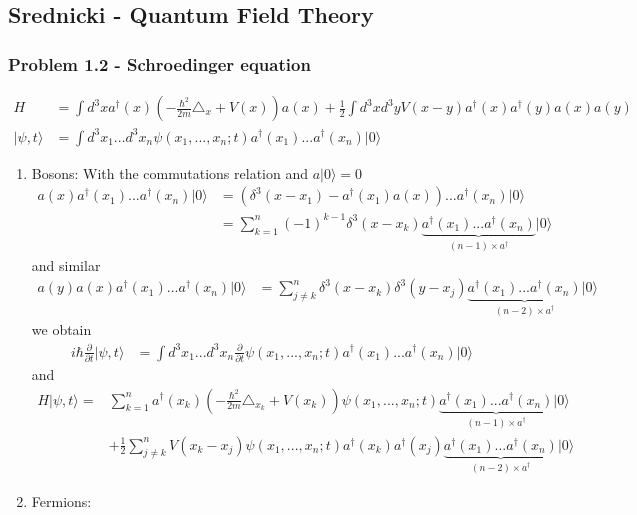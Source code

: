 \documentclass[10pt,a4paper]{book}
\theoremstyle{definition}
\begin{document}
\subsection{{\sc Srednicki} - Quantum Field Theory}
\subsubsection{Problem 1.2 - Schroedinger equation}
\begin{align}
    H&=\int d^3x a^\dagger(x)\left(-\frac{\hbar^2}{2m}\triangle_x+V(x)\right)a(x)+\frac{1}{2}\int d^3xd^3yV(x-y)a^\dagger(x)a^\dagger(y)a(x)a(y)\\
    |\psi,t\rangle&=\int d^3x_1...d^3x_n\psi(x_1,...,x_n;t)a^\dagger(x_1)...a^\dagger(x_n)|0\rangle
\end{align}
\begin{enumerate}
    \item Bosons:
    With the commutations relation and $a|0\rangle=0$
    \begin{align}
        a(x)a^\dagger(x_1)...a^\dagger(x_n)|0\rangle
        &=\left(\delta^3(x-x_1)-a^\dagger(x_1)a(x)\right)...a^\dagger(x_n)|0\rangle\\
        &=\sum_{k=1}^n(-1)^{k-1} \delta^3(x-x_k)\underbrace{a^\dagger(x_1)...a^\dagger(x_n)}_{(n-1) \times a^\dagger}|0\rangle
    \end{align}
    and similar
    \begin{align}
        a(y)a(x)a^\dagger(x_1)...a^\dagger(x_n)|0\rangle
        &=\sum_{j\neq k}^n \delta^3(x-x_k)\delta^3(y-x_j)\underbrace{a^\dagger(x_1)...a^\dagger(x_n)}_{(n-2) \times a^\dagger}|0\rangle
    \end{align}
    we obtain
	\begin{align}
		i\hbar\frac{\partial}{\partial t}|\psi,t\rangle
		&=\int d^3x_1...d^3x_n\frac{\partial}{\partial t}\psi(x_1,...,x_n;t)a^\dagger(x_1)...a^\dagger(x_n)|0\rangle 
	\end{align}
    and
    \begin{align}
        H|\psi,t\rangle=&\sum_{k=1}^na^\dagger(x_k)\left(-\frac{\hbar^2}{2m}\triangle_{x_k}+V(x_k)\right)\psi(x_1,...,x_n;t)\underbrace{a^\dagger(x_1)...a^\dagger(x_n)}_{(n-1) \times a^\dagger}|0\rangle\\
        &+\frac{1}{2}\sum_{j\neq k}^nV(x_k-x_j)\psi(x_1,...,x_n;t)a^\dagger(x_k)a^\dagger(x_j)\underbrace{a^\dagger(x_1)...a^\dagger(x_n)}_{(n-2) \times a^\dagger}|0\rangle
    \end{align}
    \item Fermions:
\end{enumerate}
\end{document}
